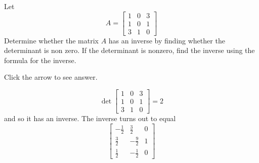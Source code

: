 \documentclass{ximera}
\begin{document}
\begin{problem}\label{prb:7.30} Let
\begin{equation*}
A =
\left[
\begin{array}{rrr}
1 & 0 & 3 \\
1 & 0 & 1 \\
3 & 1 & 0
\end{array}
\right]
\end{equation*}
Determine whether the matrix $A$ has an inverse by finding whether the
determinant is non zero. If the determinant is nonzero, find the inverse
using the formula for the inverse.

Click the arrow to see answer.
\begin{expandable}
\[
\det \left[
\begin{array}{rrr}
1 & 0 & 3 \\
1 & 0 & 1 \\
3 & 1 & 0
\end{array}
\right] = 2
\]
and so it has an inverse. The inverse turns out to equal
\[
\left[
\begin{array}{rrr}
-\frac{1}{2} & \frac{3}{2} & 0 \\
\frac{3}{2} & -\frac{9}{2} & 1 \\
\frac{1}{2} & -\frac{1}{2} & 0
\end{array}
\right]
\]
\end{expandable}
\end{problem}
\end{document}
